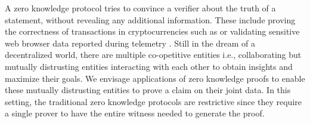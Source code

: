 A zero knowledge protocol tries to convince a verifier about the truth of a
statement, without revealing any additional information. %
These include proving the correctness of
transactions in cryptocurrencies such as \cite{zerocash} or validating sensitive web browser data reported during
telemetry \cite{prio, MozillaPrio}. Still in the dream of a decentralized world, there are
multiple co-opetitive entities i.e.,
collaborating but mutually distrusting entities interacting with each other to obtain insights
and maximize their goals. We envisage applications of zero knowledge
proofs to enable these mutually
distrusting entities to prove a claim on their joint data. In this setting, the 
traditional zero knowledge protocols are restrictive since they require
a single prover to have the entire witness needed to generate the proof. 

